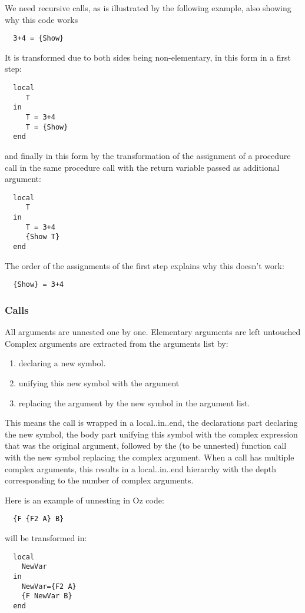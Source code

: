 \documentclass[a4paper]{memoir}
\begin{document}
We need recursive calls, as is illustrated by the following example, also showing why this code works
\begin{lstlisting}
  3+4 = {Show}
\end{lstlisting}
It is transformed due to both sides being non-elementary, in this form in a first step:
\begin{lstlisting}
  local
     T
  in
     T = 3+4
     T = {Show}
  end
\end{lstlisting}
and finally in this form by the transformation of the assignment of a procedure call in the same procedure call with the return variable passed as additional argument:
\begin{lstlisting}
  local
     T
  in
     T = 3+4
     {Show T}
  end
\end{lstlisting}
The order of the assignments of the first step explains why this doesn't work:
\begin{lstlisting}
  {Show} = 3+4
\end{lstlisting}

\subsubsection{Calls}\label{sec:arch:unnester:calls}
All arguments are unnested one by one. Elementary arguments are left untouched
Complex arguments are extracted from the arguments list by:
\begin{enumerate}
  \item declaring a new symbol. 
  \item unifying this new symbol with the argument
  \item replacing the argument by the new symbol in the argument list.
\end{enumerate}

 This means the call is wrapped in a local..in..end, the declarations part declaring the new symbol, the body part unifying this symbol with the complex expression that was the original argument, followed by the (to be unnested) function call with the new symbol replacing the complex argument. When a call has multiple complex arguments, this results in a local..in..end hierarchy with the depth corresponding to the number of complex arguments. %

Here is an example of unnesting in Oz code:
\begin{lstlisting}
  {F {F2 A} B}
\end{lstlisting}
will be transformed in:
\begin{lstlisting}
  local
    NewVar
  in
    NewVar={F2 A}
    {F NewVar B}
  end
\end{lstlisting}
\end{document}
